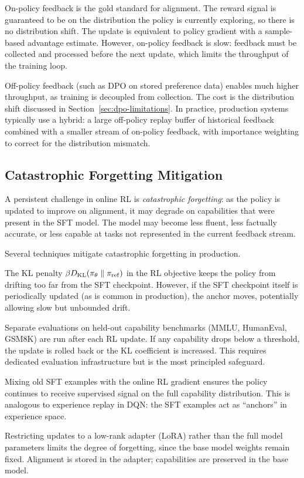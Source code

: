 On-policy feedback is the gold standard for alignment. The reward signal is guaranteed to be on the distribution the policy is currently exploring, so there is no distribution shift. The update is equivalent to policy gradient with a sample-based advantage estimate. However, on-policy feedback is slow: feedback must be collected and processed before the next update, which limits the throughput of the training loop.

Off-policy feedback (such as DPO on stored preference data) enables much higher throughput, as training is decoupled from collection. The cost is the distribution shift discussed in Section~\ref{sec:dpo-limitations}. In practice, production systems typically use a hybrid: a large off-policy replay buffer of historical feedback combined with a smaller stream of on-policy feedback, with importance weighting to correct for the distribution mismatch.

\subsection{Catastrophic Forgetting Mitigation}

A persistent challenge in online RL is \emph{catastrophic forgetting}: as the policy is updated to improve on alignment, it may degrade on capabilities that were present in the SFT model. The model may become less fluent, less factually accurate, or less capable at tasks not represented in the current feedback stream.

Several techniques mitigate catastrophic forgetting in production.

\begin{description}[leftmargin=!,labelwidth=3.5cm]
  \item[KL anchoring] The KL penalty $\beta D_{\mathrm{KL}}\!\left(\pi_\theta\;\|\;\pi_\mathrm{ref}\right)$ in the RL objective keeps the policy from drifting too far from the SFT checkpoint. However, if the SFT checkpoint itself is periodically updated (as is common in production), the anchor moves, potentially allowing slow but unbounded drift.
  \item[Capability constraints] Separate evaluations on held-out capability benchmarks (MMLU, HumanEval, GSM8K) are run after each RL update. If any capability drops below a threshold, the update is rolled back or the KL coefficient is increased. This requires dedicated evaluation infrastructure but is the most principled safeguard.
  \item[Replay buffers] Mixing old SFT examples with the online RL gradient ensures the policy continues to receive supervised signal on the full capability distribution. This is analogous to experience replay in DQN: the SFT examples act as ``anchors'' in experience space.
  \item[LoRA-based fine-tuning] Restricting updates to a low-rank adapter (LoRA) rather than the full model parameters limits the degree of forgetting, since the base model weights remain fixed. Alignment is stored in the adapter; capabilities are preserved in the base model.
\end{description}

